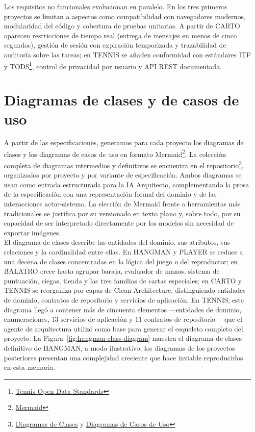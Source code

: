 Los requisitos no funcionales evolucionan en paralelo. En los tres primeros proyectos se limitan a aspectos como compatibilidad con navegadores modernos, modularidad del código y cobertura de pruebas unitarias. A partir de \ac{CARTO} aparecen restricciones de tiempo real (entrega de mensajes en menos de cinco segundos), gestión de sesión con expiración temporizada y trazabilidad de auditoría sobre las tareas; en \ac{TENNIS} se añaden conformidad con estándares ITF y TODS\footnote{\href{https://www.itftennis.com/en/about-us/governance/technical/tennis-open-data-standards/}{Tennis Open Data Standards}}, control de privacidad por usuario y \ac{API} REST documentada.

\section{Diagramas de clases y de casos de uso} \label{sec:uml}

A partir de las especificaciones, generamos para cada proyecto los diagramas de clases y los diagramas de casos de uso en formato Mermaid\footnote{\href{https://mermaid.js.org}{Mermaid}}. La colección completa de diagramas intermedios y definitivos se encuentra  en el repositorio\footnote{\href{https://github.com/alu0101549491/TFG-Fabian-Gonzalez-Lence/tree/main/resources/uml-class-diagrams}{Diagramas de Clases} y \href{https://github.com/alu0101549491/TFG-Fabian-Gonzalez-Lence/tree/main/resources/uml-use-case-diagrams}{Diagramas de Casos de Uso}}, organizados por proyecto y por variante de especificación. Ambos diagramas se usan como entrada estructurada para la \ac{IA} Arquitecto, complementando la prosa de la especificación con una representación formal del dominio y de las interacciones actor-sistema. La elección de Mermaid frente a herramientas más tradicionales se justifica por su versionado en texto plano y, sobre todo, por su capacidad de ser interpretado directamente por los modelos sin necesidad de exportar imágenes.\\

El diagrama de clases describe las entidades del dominio, sus atributos, sus relaciones y la cardinalidad entre ellas. En \ac{HANGMAN} y \ac{PLAYER} se reduce a una decena de clases concentradas en la lógica del juego o del reproductor; en \ac{BALATRO} crece hasta agrupar baraja, evaluador de manos, sistema de puntuación, ciegas, tienda y las tres familias de cartas especiales; en \ac{CARTO} y \ac{TENNIS} se reorganiza por capas de Clean Architecture, distinguiendo entidades de dominio, contratos de repositorio y servicios de aplicación. En \ac{TENNIS}, este diagrama llegó a contener más de cincuenta elementos ---entidades de dominio, enumeraciones, 13 servicios de aplicación y 11 contratos de repositorio--- que el agente de arquitectura utilizó como base para generar el esqueleto completo del proyecto. La Figura~\ref{fig:hangman-class-diagram} muestra el diagrama de clases definitivo de \ac{HANGMAN}, a modo ilustrativo; los diagramas de los proyectos posteriores presentan una complejidad creciente que hace inviable reproducirlos en esta memoria.\\

